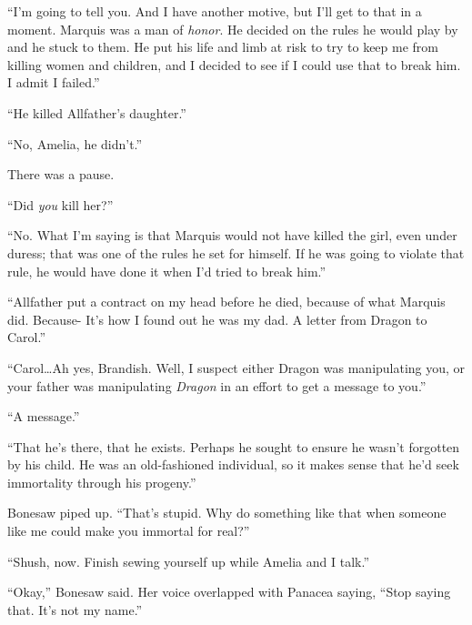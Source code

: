 ``I'm going to tell you.  And I have another motive, but I'll get to that in a moment.  Marquis was a man of \emph{honor}.  He decided on the rules he would play by and he stuck to them.  He put his life and limb at risk to try to keep me from killing women and children, and I decided to see if I could use that to break him.  I admit I failed.''



``He killed Allfather's daughter.''



``No, Amelia, he didn't.''



There was a pause.



``Did \emph{you }kill her?''



``No.  What I'm saying is that Marquis would not have killed the girl, even under duress; that was one of the rules he set for himself.  If he was going to violate that rule, he would have done it when I'd tried to break him.''



``Allfather put a contract on my head before he died, because of what Marquis did.  Because- It's how I found out he was my dad.  A letter from Dragon to Carol.''



``Carol\ldots Ah yes, Brandish.   Well, I suspect either Dragon was manipulating you, or your father was manipulating \emph{Dragon }in an effort to get a message to you.''



``A message.''



``That he's there, that he exists.  Perhaps he sought to ensure he wasn't forgotten by his child.  He was an old-fashioned individual, so it makes sense that he'd seek immortality through his progeny.''



Bonesaw piped up.  ``That's stupid.  Why do something like that when someone like me could make you immortal for real?''



``Shush, now.  Finish sewing yourself up while Amelia and I talk.''



``Okay,'' Bonesaw said.  Her voice overlapped with Panacea saying, ``Stop saying that.  It's not my name.''



